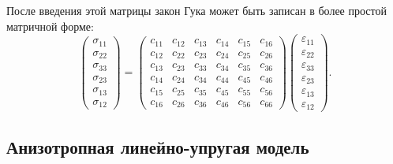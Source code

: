 \documentclass[thesis.tex]{subfiles}
\begin{document}
После введения этой матрицы закон Гука может быть записан в более простой матричной форме:
\[
    \begin{pmatrix}
    \sigma_{11} \\
    \sigma_{22} \\
    \sigma_{33} \\
    \sigma_{23} \\
    \sigma_{13} \\
    \sigma_{12}
    \end{pmatrix}
    = \begin{pmatrix}
    c_{11} & c_{12} & c_{13} & c_{14} & c_{15} & c_{16} \\
    c_{12} & c_{22} & c_{23} & c_{24} & c_{25} & c_{26} \\
    c_{13} & c_{23} & c_{33} & c_{34} & c_{35} & c_{36} \\
    c_{14} & c_{24} & c_{34} & c_{44} & c_{45} & c_{46} \\
    c_{15} & c_{25} & c_{35} & c_{45} & c_{55} & c_{56} \\
    c_{16} & c_{26} & c_{36} & c_{46} & c_{56} & c_{66}
    \end{pmatrix}
    \begin{pmatrix}
    \varepsilon_{11} \\
    \varepsilon_{22} \\
    \varepsilon_{33} \\
    \varepsilon_{23} \\
    \varepsilon_{13} \\
    \varepsilon_{12}
    \end{pmatrix}.
\]

\subsection{Анизотропная линейно-упругая модель}
\end{document}
